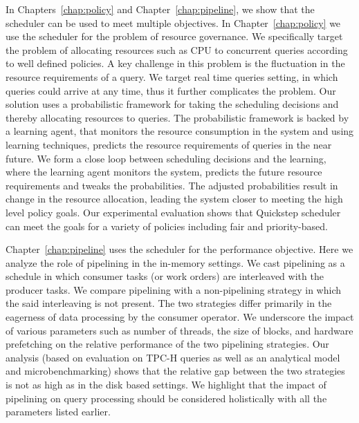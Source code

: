 In Chapters~\ref{chap:policy} and Chapter~\ref{chap:pipeline}, we show that the scheduler can be used to meet multiple objectives.
In Chapter~\ref{chap:policy} we use the scheduler for the problem of resource governance.
We specifically target the problem of allocating resources such as CPU to concurrent queries according to well defined policies.
A key challenge in this problem is the fluctuation in the resource requirements of a query.
We target real time queries setting, in which queries could arrive at any time, thus it further complicates the problem.
Our solution uses a probabilistic framework for taking the scheduling decisions and thereby allocating resources to queries.
The probabilistic framework is backed by a learning agent, that monitors the resource consumption in the system and using learning techniques, predicts the resource requirements of queries in the near future.  
We form a close loop between scheduling decisions and the learning, where the learning agent monitors the system, predicts the future resource requirements and tweaks the probabilities. 
The adjusted probabilities result in change in the resource allocation, leading the system closer to meeting the high level policy goals.
Our experimental evaluation shows that Quickstep scheduler can meet the goals for a variety of policies including fair and priority-based. 

Chapter~\ref{chap:pipeline} uses the scheduler for the performance objective.
Here we analyze the role of pipelining in the in-memory settings. 
We cast pipelining as a schedule in which consumer tasks (or work orders) are interleaved with the producer tasks. 
We compare pipelining with a non-pipelining strategy in which the said interleaving is not present. 
The two strategies differ primarily in the eagerness of data processing by the consumer operator. 
We underscore the impact of various parameters such as number of threads, the size of blocks, and hardware prefetching on the relative performance of the two pipelining strategies. 
Our analysis (based on evaluation on TPC-H queries as well as an analytical model and microbenchmarking) shows that the relative gap between the two strategies is not as high as in the disk based settings. 
We highlight that the impact of pipelining on query processing should be considered holistically with all the parameters listed earlier. 

